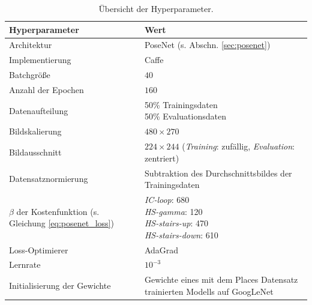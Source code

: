 \cleardoublepage
\begin{table}[bp]
	\centering
	\caption{Übersicht der Hyperparameter.}
	\begin{tabularx}{1.0\textwidth}{X X}
		\textbf{Hyperparameter} & \textbf{Wert}\\
		\hline
		Architektur & PoseNet (s. Abschn. \ref{sec:posenet})\\
		\hline
		Implementierung & Caffe \cite{jiaCaffeConvolutionalArchitecture2014} \\
		\hline
		Batchgröße & $40$\\
		\hline
		Anzahl der Epochen & $160$\\
		\hline
		Datenaufteilung & \makecell[tl]{
			50\% Trainingsdaten\\
			50\% Evaluationsdaten\\
		}\\
		\hline
		Bildskalierung & $480 \times 270$\\
		\hline
		Bildausschnitt& \makecell[tl]{
			$224 \times 244$\\
			(\textit{Training}: zufällig, \textit{Evaluation}: zentriert)\\
		}\\
		\hline
		Datensatznormierung & Subtraktion des Durchschnittsbildes der Trainingsdaten \\
		\hline
		\makecell[tl]{
			$\beta$ der Kostenfunktion\\
			(s. Gleichung \ref{eq:posenet_loss}) 
		} &
		\makecell[tl]{
			\textit{IC-loop}: 680\\
			\textit{HS-gamma}: 120\\
			\textit{HS-stairs-up}: 470\\
			\textit{HS-stairs-down}: 610\\
		}\\
		\hline
		Loss-Optimierer & AdaGrad\\
		\hline
		Lernrate & $10^{-3}$\\
		\hline
		Initialisierung der Gewichte & Gewichte eines mit dem Places Datensatz trainierten Modells auf GoogLeNet \\
	\end{tabularx}
	\label{tab:trainingparams}
\end{table}
\cleardoublepage